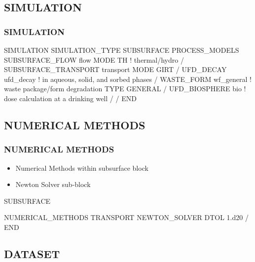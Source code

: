 \documentclass{beamer}
\newcommand\bluecomment[1]{{{\color{blue} #1}}}
\begin{document}
\subsection{SIMULATION}

\begin{frame}[fragile]\frametitle{SIMULATION}

\begin{semiverbatim}\small
SIMULATION
  SIMULATION_TYPE SUBSURFACE
  PROCESS_MODELS
    SUBSURFACE_FLOW flow
      MODE TH \bluecomment{! thermal/hydro}
    /   
    SUBSURFACE_TRANSPORT transport
      MODE GIRT
    /
    UFD_DECAY ufd_decay \bluecomment{! in aqueous, solid, and sorbed phases}
    /
    WASTE_FORM wf_general \bluecomment{! waste package/form degradation}
      TYPE GENERAL
    /
    UFD_BIOSPHERE bio \bluecomment{! dose calculation at a drinking well}
    /
  /
END
\end{semiverbatim}

\end{frame}

\subsection{NUMERICAL METHODS}

\begin{frame}[fragile]\frametitle{NUMERICAL METHODS}

\begin{itemize}
  \item Numerical Methods within subsurface block
  \item Newton Solver sub-block
\end{itemize}

\begin{semiverbatim}
SUBSURFACE

NUMERICAL_METHODS TRANSPORT
  NEWTON_SOLVER
    DTOL 1.d20
  /
END
\end{semiverbatim}

\end{frame}

\subsection{DATASET}
\end{document}
